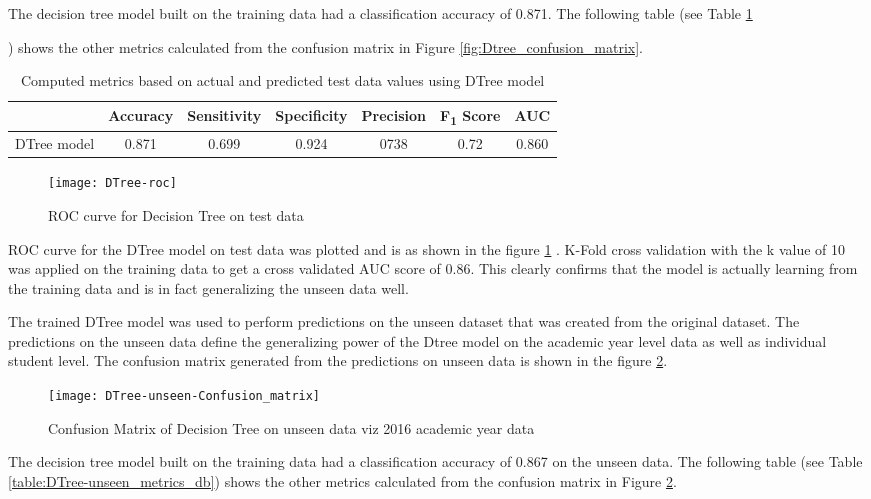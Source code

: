 \documentclass[11pt,openright]{report}
\begin{document}
The decision tree model built on the training data had a classification accuracy of 0.871. The following table (see Table \ref{table:Dtree_confusion_matrix}{) shows the other metrics calculated from the confusion matrix in Figure \ref{fig:Dtree_confusion_matrix}. 
\begin{table}
	\renewcommand{\arraystretch}{1.3}
	\caption{Computed metrics based on actual and predicted test data values using DTree model}
	\label{table:Dtree_confusion_matrix}
	\centering
	\begin{tabular}{|c|c|c|c|c|c|c|}
    \hline
  	 & \bfseries Accuracy & \bfseries Sensitivity & \bfseries Specificity & \bfseries Precision & \bfseries F\textsubscript{1} Score  & \bfseries AUC\\  
    \hline
	DTree model & 0.871 & 0.699 & 0.924 & 0738 & 0.72 & 0.860 \\ \hline
	\end{tabular} 
\end{table}

 \begin{figure}[!htbp]
	\centering
	\texttt{[image: DTree-roc]}
	\caption{ROC curve for Decision Tree on test data}
	\label{fig:DTree_roc}
\end{figure} 

ROC curve for the DTree model on test data was plotted  and is as shown in the figure \ref{fig:DTree_roc} . K-Fold cross validation with the k value of 10 was applied on the training data to get a cross validated AUC score of 0.86. This clearly confirms that the model is actually learning from the training data and is in fact generalizing the unseen data well.

The trained DTree model was used to perform predictions on the unseen dataset that was created from the original dataset. The predictions on the unseen data define the generalizing power of the Dtree model on the academic year level data as well as individual student level. The confusion matrix generated from the predictions on unseen data is shown in the figure \ref{fig:DTree_unseen_confusion_matrix}.

  \begin{figure}[!htbp]
	\centering
	\texttt{[image: DTree-unseen-Confusion\_matrix]}
	\caption{Confusion Matrix of Decision Tree on unseen data viz 2016 academic year data}
	\label{fig:DTree_unseen_confusion_matrix}
\end{figure} 


The decision tree model built on the training data had a classification accuracy of 0.867 on the unseen data. The following table (see Table \ref{table:DTree-unseen_metrics_db}) shows the other metrics calculated from the confusion matrix in Figure \ref{fig:DTree_unseen_confusion_matrix}.

}
\end{document}
